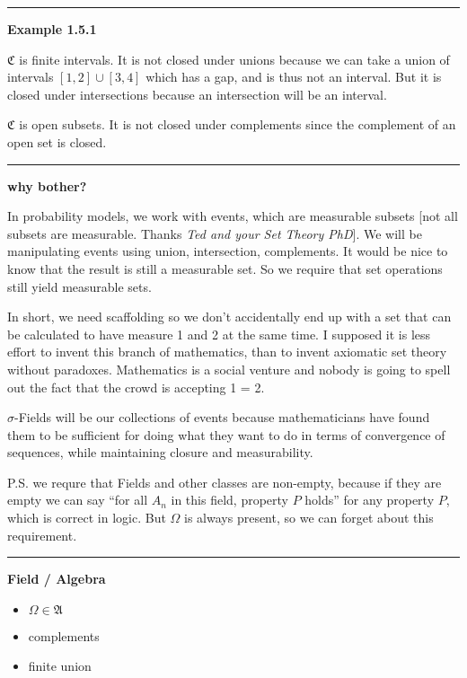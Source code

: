 \documentclass{article}
\begin{document}
\begin{flushleft}
\bigbreak
\hrule
\bigbreak
\textbf{Example 1.5.1}

$\mathfrak{C}$ is finite intervals. It is not closed under unions because we can take a union of intervals $[1,2] \cup [3,4]$ which has a gap, and is thus not an interval. But it is closed under intersections because an intersection will be an interval.

\bigbreak

$\mathfrak{C}$ is open subsets. It is not closed under complements since the complement of an open set is closed. 

\bigbreak
\hrule
\bigbreak
\textbf{why bother?}

In probability models, we work with events, which are measurable subsets [not all subsets are measurable. Thanks \emph{Ted and your Set Theory PhD}]. We will be manipulating events using union, intersection, complements. It would be nice to know that the result is still a measurable set. So we require that set operations still yield measurable sets. 

\bigbreak

In short, we need scaffolding so we don't accidentally end up with a set that can be calculated to have measure 1 and 2 at the same time. I supposed it is less effort to invent this branch of mathematics, than to invent axiomatic set theory without paradoxes. Mathematics is a social venture and nobody is going to spell out the fact that the crowd is accepting 1 = 2. 

\bigbreak

$\sigma$-Fields will be our collections of events because mathematicians have found them to be sufficient for doing what they want to do in terms of convergence of sequences, while maintaining closure and measurability.

\bigbreak

P.S. we requre that Fields and other classes are non-empty, because if they are empty we can say ``for all $A_n$ in this field, property $P$ holds'' for any property $P$, which is correct in logic. But $\Omega$ is always present, so we can forget about this requirement.

\bigbreak
\hrule
\bigbreak
\textbf{Field / Algebra}

\begin{itemize}
    \item $\Omega \in \mathfrak{A}$
    \item complements 
    \item finite union
\end{itemize}


\end{flushleft}
\end{document}

